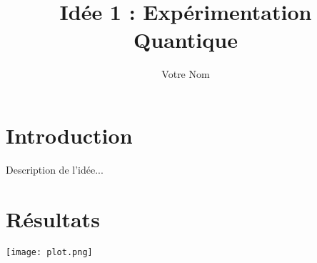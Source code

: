 \documentclass{article}
\title{Idée 1 : Expérimentation Quantique}
\author{Votre Nom}
\begin{document}
\maketitle

\section{Introduction}
Description de l'idée...

\section{Résultats}
\texttt{[image: plot.png]}
\end{document}
